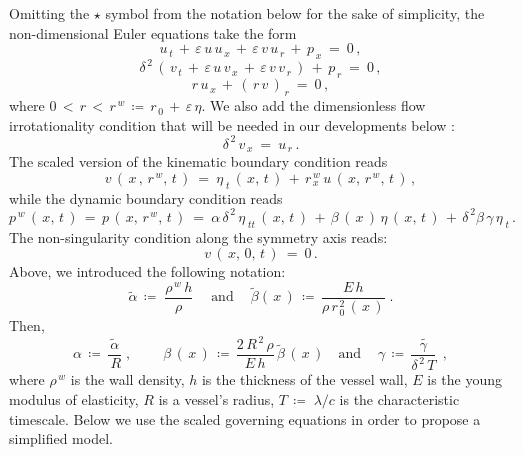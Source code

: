 \documentclass[alpha-refs, 12pt]{wiley-article}
\newcommand{\eps}{\varepsilon}
\begin{document}
Omitting the $\star$ symbol from the notation below for the sake of simplicity, the non-dimensional Euler equations take the form \citep{Mitsotakis2018}
\begin{equation}\label{eq:momentx}
  u_{\,t}\,+\,\eps\,u\,u_{\,x}\,+\,\eps\,v\, u_{\,r}\,+\,p_{\,x}\ =\ 0\,,
\end{equation}
\begin{equation}\label{eq:momenty}
  \delta^{\,2}\,(\,v_{\,t}\,+\,\eps\,u\,v_{\,x}\,+\,\eps\,v \,v_{\,r}\,)\,+\,p_{\,r}\ =\ 0\,,
\end{equation}
\begin{equation}\label{eq:cont}
  r\,u_{\,x}\,+\,(\,r\,v\,)_{\,r}\ =\ 0\,,
\end{equation}
where $0\, < \,r\, <\, r^{\,w}\,\coloneqq\,r_{\,0}\,+\,\eps\,\eta$.
We also add the dimensionless flow irrotationality condition that will be needed in our developments below \citep{Landau1987}:
\begin{equation}\label{eq:irr}
  \delta^{\,2}\,v_{\,x}\ =\ u_{\,r}\,.
\end{equation}
The scaled version of the kinematic boundary condition reads
\begin{equation}\label{eq:kin}
  v\,(\,x\,,\,r^{\,w},\,t\,)\ =\ \eta_{\;t}\,(\,x,\,t\,)\,+\,r_{\,x}^{\,w}\,u\,(\,x,\,r^{\,w},\,t\,)\,,
\end{equation}
while the dynamic boundary condition reads
\begin{equation}\label{eq:dyn}
  p^{\,w}\,(\,x,\,t\,)\,=\,p\,(\,x,\,r^{\,w},\,t\,)\ =\ \alpha\,\delta^{\,2}\,\eta_{\;tt}\,(\,x,\,t\,)\,+\,\beta\,(\,x\,)\,\eta\,(\,x,\,t\,)\,+\,\delta^{\,2}\beta\,\gamma\,\eta_{\;t}\,.
\end{equation}
The non-singularity condition along the symmetry axis reads:
\begin{equation}\label{eq:zero}
  v\,(\,x,\,0,\,t\,)\ =\ 0\,.
\end{equation}
Above, we introduced the following notation:
\begin{equation*}
  \tilde{\alpha}\,\coloneqq\;\frac{\rho^{\,w}\,h}{\rho}\; \quad \text{and} \ \quad \tilde{\beta}(\,x\,)\,\coloneqq\, \frac{E\,h}{\rho\,r_{\,0}^{\,2}\,(\,x\,)}\;. 
\end{equation*}
Then,
\begin{equation*}
  \alpha\,\coloneqq\,\frac{\tilde{\alpha}}{\,R}\;, \quad \ \quad \beta\,(\,x\,)\,\coloneqq\,\frac{2\,R^{\,2}\,\rho}{E\,h}\,\tilde{\beta}\,(\,x\,) \quad \text{and} \ \quad \gamma\,\coloneqq\,\tilde{\frac{\gamma }{\delta^{\,2}\,T}\;}\,,
\end{equation*}
where $\rho^{\,w}$ is the wall density, $h$ is the thickness of the vessel wall, $E$ is the young modulus of elasticity, $R$ is a vessel's radius, $T\, \coloneqq \;\displaystyle{\lambda}/{c}$ is the characteristic timescale. Below we use the scaled governing equations in order to propose a simplified model.
\end{document}
